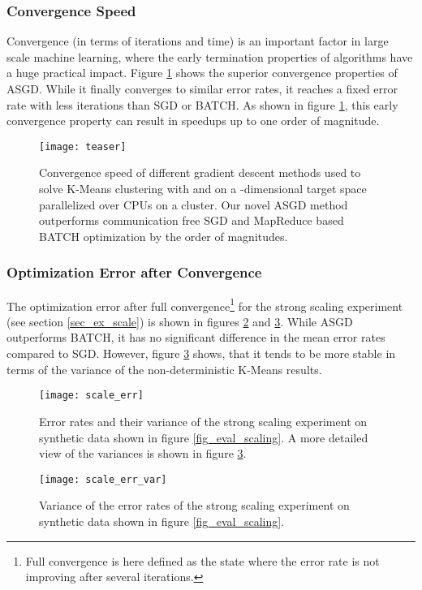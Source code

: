 \documentclass{acm_proc_article-sp}
\begin{document}
\subsubsection*{Convergence Speed\label{sec_ex_con}}
Convergence (in terms of iterations and time) is an important factor in large 
scale machine learning, where the early termination properties of algorithms 
have a huge practical impact. Figure \ref{fig_eval_conv} shows the superior 
convergence properties of ASGD. While it finally converges to similar error 
rates, it reaches a fixed error rate with less iterations than SGD or BATCH.
As shown in figure \ref{fig_eval_conv}, this early convergence property
can result in speedups up to one order of magnitude.      
\begin{figure}[!ht]
\texttt{[image: teaser]}
\caption{Convergence speed of different gradient descent methods used to solve
K-Means clustering
with  and  on a -dimensional target space parallelized  over  CPUs
on a cluster. Our novel ASGD method outperforms communication free SGD
\cite{SGDsmola} and
MapReduce
based BATCH \cite{chu2007map} optimization by the order of magnitudes.
\label{fig_eval_conv}
}
\end{figure}
\newpage
\subsubsection*{Optimization Error after Convergence\label{sec_ex_err}} 
The optimization error after full convergence\footnote{Full convergence is 
here defined as the state where the error rate is not improving after 
several iterations.} for the strong scaling experiment (see section \ref{sec_ex_scale})
is shown in figures \ref{fig_scale_err} and \ref{fig_scale_var}. While ASGD 
outperforms BATCH, it has no significant difference in the mean error rates
compared to SGD. However, figure \ref{fig_scale_var} shows, that it 
tends to be more stable in terms of the variance of the non-deterministic
K-Means results.  
\begin{figure}[!ht]
\texttt{[image: scale\_err]}
\caption{Error rates and their variance of the strong scaling experiment 
on synthetic data shown in figure \ref{fig_eval_scaling}. A more detailed 
view of the variances is shown in figure \ref{fig_scale_var}.
\label{fig_scale_err}}
\end{figure}

\begin{figure}[!ht]
\texttt{[image: scale\_err\_var]}
\caption{Variance of the error rates of the strong scaling experiment 
on synthetic data shown in figure \ref{fig_eval_scaling}.
\label{fig_scale_var}}
\end{figure}
\end{document}
